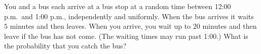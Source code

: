 You and a bus each arrive at a bus stop at a random time between 12:00 p.m.\ and 1:00 p.m., independently and uniformly. When the bus arrives it waits $5$ minutes and then leaves. When you arrive, you wait up to $20$ minutes and then leave if the bus has not come. (The waiting times may run past 1:00.) What is the probability that you catch the bus?
